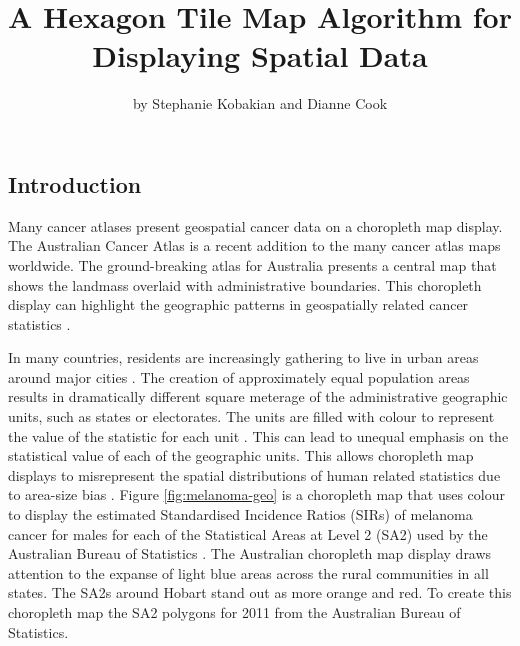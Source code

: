 \title{A Hexagon Tile Map Algorithm for Displaying Spatial Data}
\author{by Stephanie Kobakian and Dianne Cook}

\maketitle


\hypertarget{introduction}{%
\subsection{Introduction}\label{introduction}}

Many cancer atlases present geospatial cancer data on a choropleth map
display. The Australian Cancer Atlas \citep{TACA} is a recent addition
to the many cancer atlas maps worldwide. The ground-breaking atlas for
Australia presents a central map that shows the landmass overlaid with
administrative boundaries. This choropleth display can highlight the
geographic patterns in geospatially related cancer statistics
\citep{SAMGIS}.

In many countries, residents are increasingly gathering to live in urban
areas around major cities \citep{ACTUC}. The creation of approximately
equal population areas results in dramatically different square meterage
of the administrative geographic units, such as states or electorates.
The units are filled with colour to represent the value of the statistic
for each unit \citep{EI}. This can lead to unequal emphasis on the
statistical value of each of the geographic units. This allows
choropleth map displays to misrepresent the spatial distributions of
human related statistics due to area-size bias \citep{BCM}. Figure
\ref{fig:melanoma-geo} is a choropleth map that uses colour to display
the estimated Standardised Incidence Ratios (SIRs) of melanoma cancer
for males for each of the Statistical Areas at Level 2 (SA2) used by the
Australian Bureau of Statistics \citeyearpar{abs2011}. The Australian
choropleth map display draws attention to the expanse of light blue
areas across the rural communities in all states. The SA2s around Hobart
stand out as more orange and red. To create this choropleth map the SA2
polygons for 2011 from the Australian Bureau of Statistics.

